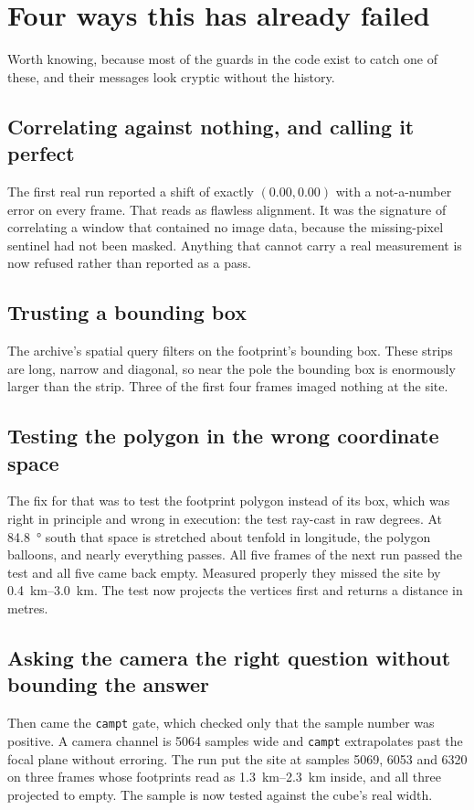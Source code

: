 \documentclass[11pt]{article}
\begin{document}
\section{Four ways this has already failed}

Worth knowing, because most of the guards in the code exist to catch one of these, and
their messages look cryptic without the history.

\subsection{Correlating against nothing, and calling it perfect}
The first real run reported a shift of exactly $(0.00, 0.00)$ with a not-a-number error
on every frame. That reads as flawless alignment. It was the signature of correlating a
window that contained no image data, because the missing-pixel sentinel had not been
masked. Anything that cannot carry a real measurement is now refused rather than
reported as a pass.

\subsection{Trusting a bounding box}
The archive's spatial query filters on the footprint's bounding box. These strips are
long, narrow and diagonal, so near the pole the bounding box is enormously larger than
the strip. Three of the first four frames imaged nothing at the site.

\subsection{Testing the polygon in the wrong coordinate space}
The fix for that was to test the footprint polygon instead of its box, which was right
in principle and wrong in execution: the test ray-cast in raw degrees. At
\SI{84.8}{\degree} south that space is stretched about tenfold in longitude, the polygon
balloons, and nearly everything passes. All five frames of the next run passed the test
and all five came back empty. Measured properly they missed the site by
\SIrange{0.4}{3.0}{\kilo\meter}. The test now projects the vertices first and returns a
distance in metres.

\subsection{Asking the camera the right question without bounding the answer}
Then came the \texttt{campt} gate, which checked only that the sample number was
positive. A camera channel is 5064 samples wide and \texttt{campt} extrapolates past the
focal plane without erroring. The run put the site at samples 5069, 6053 and 6320 on
three frames whose footprints read as \SIrange{1.3}{2.3}{\kilo\meter} inside, and all
three projected to empty. The sample is now tested against the cube's real width.
\end{document}
